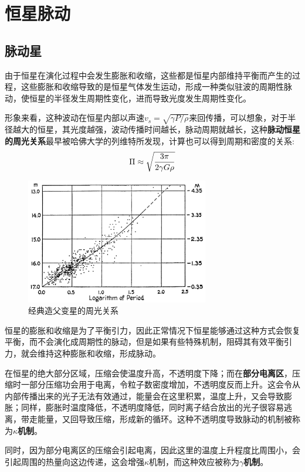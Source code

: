 \documentclass[openany]{ctexbook}
\begin{document}
\chapter{恒星脉动}
\section{脉动星}
由于恒星在演化过程中会发生膨胀和收缩，这些都是恒星内部维持平衡而产生的过程，这些膨胀和收缩导致的是恒星气体发生运动，形成一种类似驻波的周期性脉动，使恒星的半径发生周期性变化，进而导致光度发生周期性变化。

形象来看，这种波动在恒星内部以声速$v_s=\sqrt{\gamma P/\rho}$来回传播，可以想象，对于半径越大的恒星，其光度越强，波动传播时间越长，脉动周期就越长，这种\textbf{脉动恒星的周光关系}最早被哈佛大学的列维特所发现，计算也可以得到周期和密度的关系:
\begin{equation}
  \Pi\approx\sqrt{3\pi \over 2\gamma G\rho}
\end{equation}

\begin{figure}[hbt]
  \centering
  \includegraphics[width=8cm]{chapters/14/cepheid}
  \caption{经典造父变星的周光关系}
  \label{}
\end{figure}

恒星的膨胀和收缩是为了平衡引力，因此正常情况下恒星能够通过这种方式会恢复平衡，而不会演化成周期性的脉动，但是如果有些特殊机制，阻碍其有效平衡引力，就会维持这种膨胀和收缩，形成脉动。

在恒星的绝大部分区域，压缩会使温度升高，不透明度下降；而在\textbf{部分电离区}，压缩时一部分压缩功会用于电离，令粒子数密度增加，不透明度反而上升。这会令从内部传播出来的光子无法有效通过，能量会在这里积累，温度上升，又会导致膨胀；同样，膨胀时温度降低，不透明度降低，同时离子结合放出的光子很容易逃离，带走能量，又回导致压缩，形成新的循环。这种不透明度导致脉动的机制被称为\textbf{$\kappa$机制}。

同时，因为部分电离区的压缩会引起电离，因此这里的温度上升程度比周围小，会引起周围的热量向这边传递，这会增强$\kappa$机制，而这种效应被称为\textbf{$\gamma$机制}。
\end{document}
